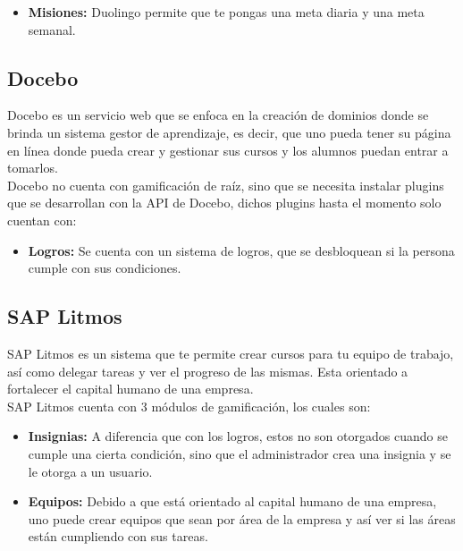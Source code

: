 \begin{multicols*}{2}
\begin{itemize}
    \item {\bf Misiones:} Duolingo permite que te pongas una meta diaria y una meta semanal.

    \end{itemize}


\subsection*{Docebo}

 Docebo \cite{PagDocebo} es un servicio web que se enfoca en la creación de dominios donde se brinda
 un sistema gestor de aprendizaje, es decir, que uno pueda tener su página en línea
 donde pueda crear y gestionar sus cursos y los alumnos puedan entrar a tomarlos.\\

 \noindent Docebo no cuenta con gamificación de raíz, sino que se necesita instalar
 plugins que se desarrollan con la API de Docebo, dichos plugins hasta el momento
 solo cuentan con:

    \begin{itemize}
        \item {\bf Logros:} Se cuenta con un sistema de logros,
        que se desbloquean si la persona cumple con sus condiciones.
    \end{itemize}



\subsection*{SAP Litmos}

 SAP Litmos \cite{PagSAPLitmos} es un sistema que te permite crear cursos para tu equipo de trabajo,
 así como delegar tareas y ver el progreso de las mismas. Esta orientado a
 fortalecer el capital humano de una empresa.\\

    \noindent SAP Litmos cuenta con 3 módulos de gamificación, los cuales son:

    \begin{itemize}
        \item {\bf Insignias:} A diferencia que con los logros, estos
        no son otorgados cuando se cumple una cierta condición, sino
        que el administrador crea una insignia y se le otorga a un usuario.

        \item {\bf Equipos: } Debido a que está orientado al capital humano
         de una empresa, uno puede crear equipos que sean por área de la
          empresa y así ver si las áreas están cumpliendo con sus tareas.


\end{itemize}
\end{multicols*}
